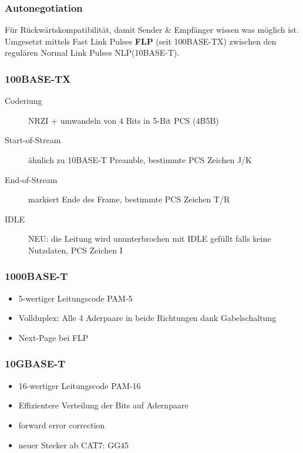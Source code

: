\subsubsection{Autonegotiation}

Für Rückwärtskompatibilität, damit Sender \& Empfänger wissen was möglich ist. \\
Umgesetzt mittels Fast Link Pulses \textbf{FLP} (seit 100BASE-TX) zwischen den regulären Normal Link
Pulses NLP(10BASE-T).

\subsubsection{100BASE-TX}
\begin{description}
	\item[Coderiung] NRZI + umwandeln von 4 Bits in 5-Bit PCS (4B5B)
	\item[Start-of-Stream] ähnlich zu 10BASE-T Preamble, bestimmte PCS Zeichen J/K
	\item[End-of-Stream] markiert Ende des Frame, bestimmte PCS Zeichen T/R
	\item[IDLE] NEU: die Leitung wird ununterbrochen mit IDLE gefüllt falls keine
		Nutzdaten, PCS Zeichen I
\end{description}


\subsubsection{1000BASE-T}
\begin{itemize}
	\item 5-wertiger Leitungscode PAM-5
	\item Vollduplex: Alle 4 Aderpaare in beide Richtungen dank Gabelschaltung
	\item Next-Page bei FLP
\end{itemize}


\subsubsection{10GBASE-T}
\begin{itemize}
	\item 16-wertiger Leitungscode PAM-16
	\item Effizientere Verteilung der Bits auf Adernpaare
	\item forward error correction
	\item neuer Stecker ab CAT7: GG45
\end{itemize}



